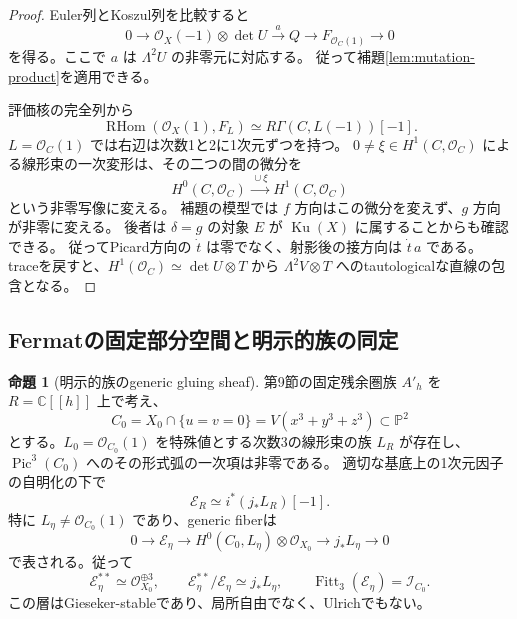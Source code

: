\documentclass[a4paper,11pt]{ltjsarticle}
\theoremstyle{definition}
\newtheorem{theorem}{命題}[section]
\newcommand{\CC}{\mathbb C}
\newcommand{\OO}{\mathcal O}
\newcommand{\PP}{\mathbb P}
\newcommand{\Ku}{\operatorname{Ku}}
\newcommand{\RHom}{\operatorname{RHom}}
\newcommand{\Pic}{\operatorname{Pic}}
\begin{document}
\begin{proof}
Euler列とKoszul列を比較すると
\[
 0\longrightarrow\OO_X(-1)\otimes\det U
   \xrightarrow{a}Q\longrightarrow F_{\OO_C(1)}\longrightarrow0
\]
を得る。ここで $a$ は $\Lambda^2U$ の非零元に対応する。
従って補題\ref{lem:mutation-product}を適用できる。

評価核の完全列から
\[
 \RHom(\OO_X(1),F_L)\simeq R\Gamma(C,L(-1))[-1].
\]
$L=\OO_C(1)$ では右辺は次数1と2に1次元ずつを持つ。
$0\ne\xi\in H^1(C,\OO_C)$ による線形束の一次変形は、その二つの間の微分を
\[
 H^0(C,\OO_C)\xrightarrow{\,\cup\xi\,}H^1(C,\OO_C)
\]
という非零写像に変える。
補題の模型では $f$ 方向はこの微分を変えず、$g$ 方向が非零に変える。
後者は $\delta=g$ の対象 $E$ が $\Ku(X)$ に属することからも確認できる。
従ってPicard方向の $\dot t$ は零でなく、射影後の接方向は $\dot t\,a$ である。
traceを戻すと、$H^1(\OO_C)\simeq\det U\otimes T$ から
$\Lambda^2V\otimes T$ へのtautologicalな直線の包含となる。
\end{proof}

\subsection{Fermatの固定部分空間と明示的族の同定}

\begin{theorem}[明示的族のgeneric gluing sheaf]\label{thm:explicit-gluing-sheaf}
第9節の固定残余圏族 $A'_h$ を $R=\CC[[h]]$ 上で考え、
\[
 C_0=X_0\cap\{u=v=0\}=V(x^3+y^3+z^3)\subset\PP^2
\]
とする。$L_0=\OO_{C_0}(1)$ を特殊値とする次数3の線形束の族 $L_R$ が存在し、
$\Pic^3(C_0)$ へのその形式弧の一次項は非零である。
適切な基底上の1次元因子の自明化の下で
\[
 \mathcal E_R\simeq i^*(j_*L_R)[-1].
\]
特に $L_\eta\ne\OO_{C_0}(1)$ であり、generic fiberは
\begin{equation}\label{eq:explicit-gluing-evaluation}
 0\longrightarrow\mathcal E_\eta\longrightarrow
 H^0(C_0,L_\eta)\otimes\OO_{X_0}
 \longrightarrow j_*L_\eta\longrightarrow0
\end{equation}
で表される。従って
\[
 \mathcal E_\eta^{**}\simeq\OO_{X_0}^{\oplus3},\qquad
 \mathcal E_\eta^{**}/\mathcal E_\eta\simeq j_*L_\eta,
 \qquad\operatorname{Fitt}_3(\mathcal E_\eta)=\mathcal I_{C_0}.
\]
この層はGieseker-stableであり、局所自由でなく、Ulrichでもない。
\end{theorem}
\end{document}
